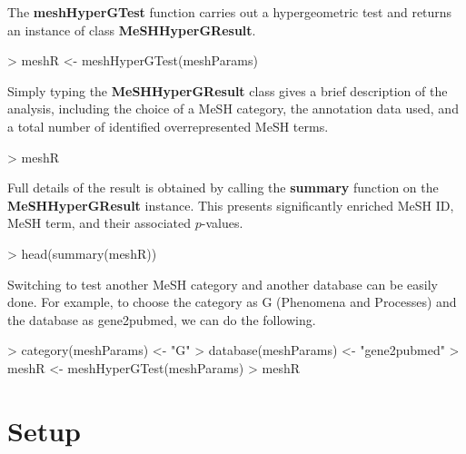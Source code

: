 \documentclass[11pt]{article}
\begin{document}
The \textbf{meshHyperGTest} function carries out a hypergeometric test and returns an instance of class \textbf{MeSHHyperGResult}.

\begin{center}
\begin{Schunk}
\begin{Sinput}
> meshR <- meshHyperGTest(meshParams)
\end{Sinput}
\end{Schunk}
\end{center}

Simply typing the \textbf{MeSHHyperGResult} class gives a brief description of the analysis, including
the choice of a MeSH category, the annotation data used, and a total number of identified overrepresented MeSH terms.

\begin{center}
\begin{Schunk}
\begin{Sinput}
> meshR
\end{Sinput}
\end{Schunk}
\end{center}

Full details of the result is obtained by calling the \textbf{summary} function on the \textbf{MeSHHyperGResult} instance.
This presents significantly enriched MeSH ID, MeSH term, and their associated $p$-values.

\begin{center}
\begin{Schunk}
\begin{Sinput}
> head(summary(meshR))
\end{Sinput}
\end{Schunk}
\end{center}

Switching to test another MeSH category and another database can be easily done.
For example, to choose the category as G (Phenomena and Processes) and the database as gene2pubmed, we can do the following.

\begin{center}
\begin{Schunk}
\begin{Sinput}
> category(meshParams) <- "G"
> database(meshParams) <- "gene2pubmed"
> meshR <- meshHyperGTest(meshParams)
> meshR
\end{Sinput}
\end{Schunk}
\end{center}

\clearpage
\section{Setup}
\end{document}
